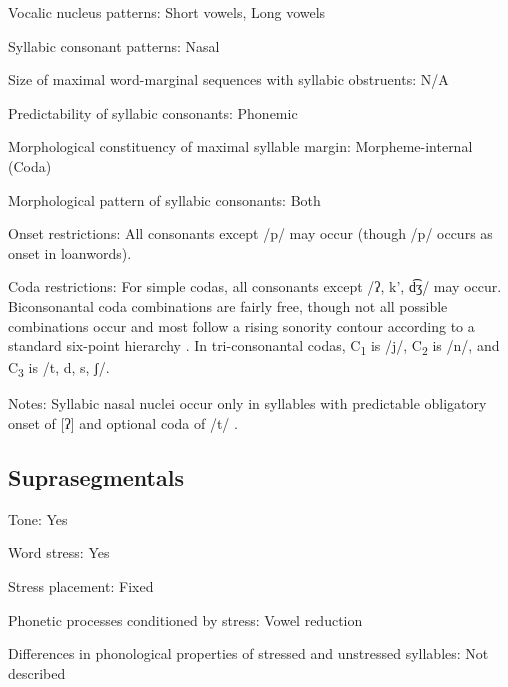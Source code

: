 {\begin{appendixdesc}
\item[Vocalic nucleus patterns:] Short vowels, Long vowels

\item[Syllabic consonant patterns:] Nasal

\item[Size of maximal word-marginal sequences with syllabic obstruents:] N/A

\item[Predictability of syllabic consonants:] Phonemic

\item[Morphological constituency of maximal syllable margin:] Morpheme-internal (Coda)

\item[Morphological pattern of syllabic consonants:] Both

\item[Onset restrictions:] All consonants except /p/ may occur (though /p/ occurs as onset in loanwords).

\item[Coda restrictions:] For simple codas, all consonants except /ʔ, k’, d͡ʒ/ may occur. Biconsonantal coda combinations are fairly free, though not all possible combinations occur and most follow a rising sonority contour according to a standard six-point hierarchy . In tri-consonantal codas, C\textsubscript{1} is /j/, C\textsubscript{2} is /n/, and C\textsubscript{3} is /t, d, s, ʃ/.

\item[Notes:] Syllabic nasal nuclei occur only in syllables with predictable obligatory onset of [ʔ] and optional coda of /t/ \citep[41]{Beachy2005}.
\end{appendixdesc}
\subsection*{Suprasegmentals}
\begin{appendixdesc}
\item[Tone:] Yes

\item[Word stress:] Yes

\item[Stress placement:] Fixed

\item[Phonetic processes conditioned by stress:] Vowel reduction

\item[Differences in phonological properties of stressed and unstressed syllables:] Not described


\end{appendixdesc}}
